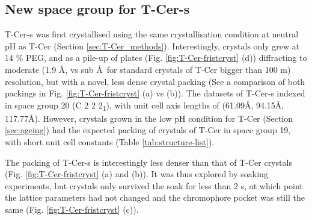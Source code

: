 \subsection{New space group for T-Cer-s}\label{sec:newspacegroup}

T-Cer-s was first crystallised using the same crystallisation condition at neutral pH as T-Cer (Section \ref{sec:T-Cer_methods}). Interestingly, crystals only grew at 14 \% PEG, and as a pile-up of plates (Fig. \ref{fig:T-Cer-fristcryst} (d)) diffracting to moderate (1.9 \AA, vs sub \AA\ for standard crystals of T-Cer bigger than 100 \textmu m) resolution, but with a novel, less dense crystal packing (See a comparison of both packings in Fig. \ref{fig:T-Cer-fristcryst} (a) vs (b)). The datasets of T-Cer-s indexed in space group 20 (C 2 2 2\textsubscript{1}), with unit cell axis lengths of (61.09\AA, 94.15\AA, 117.77\AA). However, crystals grown in the low pH condition for T-Cer (Section \ref{sec:ageing}) had the expected packing of crystals of T-Cer in space group 19, with short unit cell constants (Table \ref{tab:structure-list}).

The packing of T-Cer-s is interestingly less denser than that of T-Cer crystals (Fig. \ref{fig:T-Cer-fristcryst} (a) and (b)). It was thus explored by soaking experiments, but crystals only survived the soak for less than 2 s, at which point the lattice parameters had not changed and the chromophore pocket was still the same (Fig. \ref{fig:T-Cer-fristcryst} (c)). 

